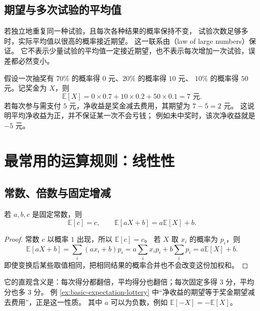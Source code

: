 \documentclass[UTF8]{ctexart}
\begin{document}
\subsection{期望与多次试验的平均值}

若独立地重复同一种试验，且每次各种结果的概率保持不变，
试验次数足够多时，实际平均值以很高的概率接近期望。
这一联系由（law of large numbers）保证。
它不表示少量试验的平均值一定接近期望，也不表示每次增加一次试验，误差都必然变小。

\begin{example}[奖金与净收益]
\label{ex:basic-expectation-lottery}
假设一次抽奖有 $70\%$ 的概率得 $0$ 元、$20\%$ 的概率得 $10$ 元、
$10\%$ 的概率得 $50$ 元。记奖金为 $X$，则
\[
  \mathbb E[X]=0\times0.7+10\times0.2+50\times0.1=7\text{ 元}.
\]
若每次参与需支付 $5$ 元，净收益是奖金减去费用，其期望为 $7-5=2$ 元。
这说明平均净收益为正，并不保证某一次不会亏钱；
例如未中奖时，该次净收益就是 $-5$ 元。
\end{example}

\section{最常用的运算规则：线性性}
\label{sec:basic-expectation-linearity}

\subsection{常数、倍数与固定增减}

\begin{property}[常数与一次式]
若 $a,b,c$ 是固定常数，则
\begin{equation}
  \mathbb E[c]=c,\qquad
  \mathbb E[aX+b]=a\mathbb E[X]+b.
  \label{eq:basic-expectation-affine}
\end{equation}
\end{property}

\begin{proof}
常数 $c$ 以概率 $1$ 出现，所以 $\mathbb E[c]=c$。
若 $X$ 取 $x_i$ 的概率为 $p_i$，则
\[
  \mathbb E[aX+b]
  =\sum_i(ax_i+b)p_i
  =a\sum_i x_ip_i+b\sum_i p_i
  =a\mathbb E[X]+b.
\]
即使变换后某些取值相同，把相同结果的概率合并也不会改变这份加权和。
\end{proof}

它的直观含义是：每次得分都翻倍，平均得分也翻倍；每次固定多得 $3$ 分，平均分也多 $3$ 分。
例 \ref{ex:basic-expectation-lottery} 中“净收益的期望等于奖金期望减去费用”，正是这一性质。
其中 $a$ 可以为负数，例如 $\mathbb E[-X]=-\mathbb E[X]$。
\end{document}
